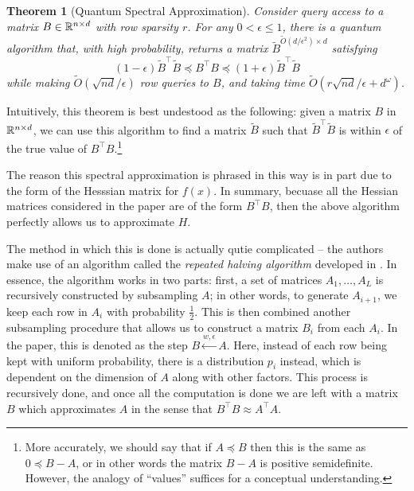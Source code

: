 \documentclass[11pt]{article}
\newtheorem{theorem}{Theorem}
\begin{document}
\begin{theorem}[Quantum Spectral Approximation]
	Consider query access to a matrix \( B \in \mathbb R^{n \times d} \) with row sparsity \( r \). For any \( 0 < 
	\epsilon \le 1\), there is a quantum algorithm that, with high probability, returns a matrix \( \tilde B^{
	\widetilde O(d / \epsilon^2) \times d} \) satisfying 
	\[
		(1 - \epsilon) \tilde B^{\top} \tilde B \preceq B ^{\top} B \preceq (1 + \epsilon) \tilde B^{\top} \tilde B
	\] 
	while making \( \widetilde O(\sqrt{nd}  / \epsilon) \) row queries to \( B \), and taking time 
	\( \widetilde O(r\sqrt{nd} / \epsilon + d^{\omega}) \).  
\end{theorem}
Intuitively, this theorem is best undestood as the following: given a matrix \( B \) in \( \mathbb R^{n \times d} \), 
we can use this algorithm to find a matrix \( \tilde B \) such that \( \tilde B^{\top} \tilde B \) is 
within \( \epsilon \) of the true value of \( B^{\top} B \).\footnote{More accurately, we should say that 
	if \( A \preceq B \) then this is the same as \( 0 \preceq B - A \), or in other words the matrix \( B - A \) is 
positive semidefinite. However, the analogy of ``values'' suffices for a conceptual understanding.}  

The reason this spectral approximation is phrased in this way is in part due to the form of the Hesssian matrix 
for \( f(x) \). In summary, becuase all the Hessian matrices considered in the paper are of the form 
\( B^{\top}B \), then the above algorithm perfectly allows us to approximate \( H \).  

The method in which this is done is actually qutie complicated -- the authors make use of an algorithm called 
the \textit{repeated halving algorithm} developed in \cite{cohenEll_pRowSampling2014}. 
In essence, the algorithm works in two parts: first, 
a set of matrices \( A_1, \dots, A_{L} \) is recursively constructed by subsampling \( A \); in other words, 
to generate \( A_{i + 1} \), we keep each row in \( A_i \) with probability \( \frac{1}{2} \). This is then 
combined another subsampling procedure that allows us to construct a matrix \( B_i \) from each \( A_i \). In 
the paper, this is denoted as the step \( B \overset{w, \epsilon}{\leftarrow} A \). Here, instead of each row 
being kept with uniform probability, there is a distribution \( p_i \) instead, which is dependent on the 
dimension of \( A \) along with other factors. This process is recursively done, and once all the 
computation is done we are left with a matrix \( B \) which approximates \( A \) in the sense 
that \( B^{\top}B \approx A^{\top}A \).
 
\end{document}
